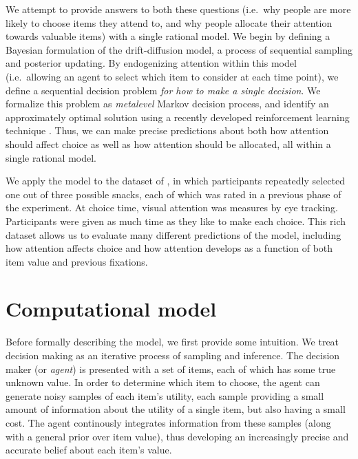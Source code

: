 \documentclass[12pt,a4paperpaper,]{article}
\begin{document}
We attempt to provide answers to both these questions (i.e.~why people are more likely to choose items they attend to, and why people allocate their attention towards valuable items) with a single rational model. We begin by defining a Bayesian formulation of the drift-diffusion model, a process of sequential sampling and posterior updating. By endogenizing attention within this model (i.e.~allowing an agent to select which item to consider at each time point), we define a sequential decision problem \emph{for how to make a single decision}. We formalize this problem as \emph{metalevel} Markov decision process, and identify an approximately optimal solution using a recently developed reinforcement learning technique \citep{callaway2018learning}. Thus, we can make precise predictions about both how attention should affect choice as well as how attention should be allocated, all within a single rational model.

We apply the model to the dataset of \citet{Krajbich2011}, in which participants repeatedly selected one out of three possible snacks, each of which was rated in a previous phase of the experiment. At choice time, visual attention was measures by eye tracking. Participants were given as much time as they like to make each choice. This rich dataset allows us to evaluate many different predictions of the model, including how attention affects choice and how attention develops as a function of both item value and previous fixations.

\section{Computational model}

Before formally describing the model, we first provide some intuition. We treat decision making as an iterative process of sampling and inference. The decision maker (or \emph{agent}) is presented with a set of items, each of which has some true unknown value. In order to determine which item to choose, the agent can generate noisy samples of each item's utility, each sample providing a small amount of information about the utility of a single item, but also having a small cost. The agent continously integrates information from these samples (along with a general prior over item value), thus developing an increasingly precise and accurate belief about each item's value.
\end{document}
